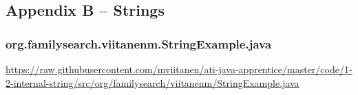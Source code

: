 \subsection*{Appendix B -- Strings} \label{App:AppendixB}

\subsubsection*{org.familysearch.viitanenm.StringExample.java}
\noindent
\begin{minipage}{.6in}
\end{minipage}
\begin{minipage}{6in}
  \url{https://raw.githubusercontent.com/mviitanen/ati-java-apprentice/master/code/1-2-internal-string/src/org/familysearch/viitanenm/StringExample.java}
\end{minipage}
